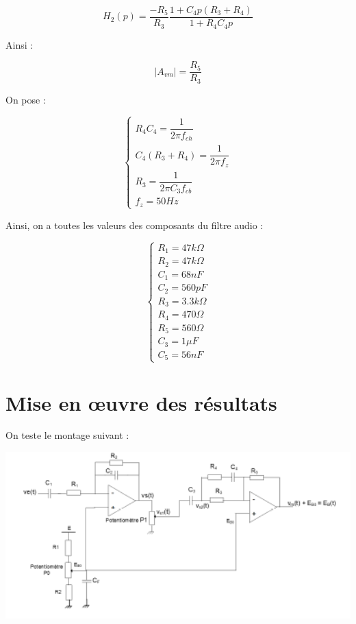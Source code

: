 \documentclass[a4paper]{report}
\begin{document}
$$H_2(p) = \dfrac{-R_5}{R_3}\dfrac{1+C_4p(R_3+R_4)}{1+R_4C_4p}$$

Ainsi :

$$|A_{vm}| = \dfrac{R_5}{R_3}$$

On pose :

$$\left\{
\begin{array}{l}
  R_4C_4 = \dfrac{1}{2\pi f_{ch}}\\
  C_4(R_3+R_4) = \dfrac{1}{2\pi f_z}\\
  R_3 = \dfrac{1}{2\pi C_3f_{cb}}\\
  f_z = 50Hz
\end{array}
\right.$$
\newline
\newline

Ainsi, on a toutes les valeurs des composants du filtre audio :


$$\left\{
\begin{array}{l}
  R_1 = 47k\Omega\\
  R_2 = 47k\Omega\\
  C_1 = 68nF\\
  C_2 = 560pF\\
  R_3 = 3.3k\Omega\\
  R_4 = 470\Omega\\
  R_5 = 560\Omega\\
  C_3 = 1\mu F\\
  C_5 = 56nF
\end{array}
\right.$$
\newline
\newline

\section{Mise en \oe uvre des résultats}

On teste le montage suivant :

\begin{center}
\includegraphics[width=1\textwidth]{montage_filtre_audio_complet.PNG}
\end{center}
\end{document}
